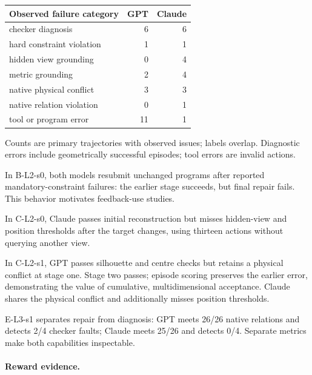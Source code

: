 \begin{center}\small

\begin{tabular}{lrr}\toprule

Observed failure category & GPT & Claude \\ \midrule

checker diagnosis & 6 & 6 \\

hard constraint violation & 1 & 1 \\

hidden view grounding & 0 & 4 \\

metric grounding & 2 & 4 \\

native physical conflict & 3 & 3 \\

native relation violation & 0 & 1 \\

tool or program error & 11 & 1 \\

\bottomrule\end{tabular}\end{center}

Counts are primary trajectories with observed issues; labels overlap. Diagnostic errors include geometrically successful episodes; tool errors are invalid actions.

In B-L2-s0, both models resubmit unchanged programs after reported mandatory-constraint failures: the earlier stage succeeds, but final repair fails. This behavior motivates feedback-use studies.

In C-L2-s0, Claude passes initial reconstruction but misses hidden-view and position thresholds after the target changes, using thirteen actions without querying another view.

In C-L2-s1, GPT passes silhouette and centre checks but retains a physical conflict at stage one. Stage two passes; episode scoring preserves the earlier error, demonstrating the value of cumulative, multidimensional acceptance. Claude shares the physical conflict and additionally misses position thresholds.

E-L3-s1 separates repair from diagnosis: GPT meets 26/26 native relations and detects 2/4 checker faults; Claude meets 25/26 and detects 0/4. Separate metrics make both capabilities inspectable.

\paragraph{Reward evidence.}

